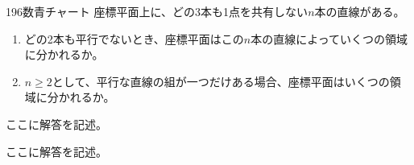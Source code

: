 \begin{prob}{196}{}{数青チャート}
 座標平面上に、どの3本も1点を共有しない$n$本の直線がある。
 \begin{enumerate}
  \item どの2本も平行でないとき、座標平面はこの$n$本の直線によっていくつの領域に分かれるか。
  \item $n\ge 2$として、平行な直線の組が一つだけある場合、座標平面はいくつの領域に分かれるか。
 \end{enumerate}
\end{prob}

ここに解答を記述。

ここに解答を記述。